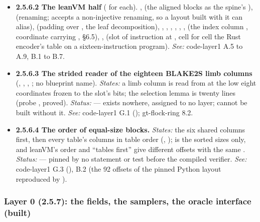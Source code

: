 \begin{itemize}[label={}, leftmargin=1.3em, itemindent=-1.3em, labelwidth=0pt, labelsep=0pt, itemsep=4pt, topsep=3pt]
\item {}\label{obl:node-2.5.6.2}\textbf{2.5.6.2 The leanVM half} ( for each). ,  (the aligned blocks as the spine's ),  (renaming; accepts a non-injective renaming, so a layout built with it can alias),  (padding  over , the leaf decomposition), , , , , , ,  (the index column , coordinate  carrying , §6.5), ,  (slot  of instruction  at , cell for cell the Rust encoder's table on a sixteen-instruction program). \emph{See:} code-layer1 A.5 to A.9, B.1 to B.7.
\item {}\label{obl:node-2.5.6.3}\oblflag\textbf{2.5.6.3 The strided reader of the eighteen BLAKE2S limb columns} (, , , ; no blueprint name). \emph{States:} a limb column is read from  at the low eight coordinates frozen to the slot's bits; the selection lemma is twenty lines (probe , proved). \emph{Status:}   — exists nowhere, assigned to no layer;  cannot be built without it. \emph{See:} code-layer1 G.1 (); gt-flock-ring 8.2.
\item {}\label{obl:node-2.5.6.4}\oblflag\textbf{2.5.6.4 The order of equal-size blocks.} \emph{States:} the six shared columns first, then every table's columns in table order (, );  is the sorted sizes only, and leanVM's order and ``tables first'' give different offsets with the same . \emph{Status:}   — pinned by no statement or test before the compiled verifier. \emph{See:} code-layer1 G.3 (), B.2 (the 92 offsets of the pinned Python layout reproduced by ).
\end{itemize}

\subsubsection[Layer 0 (2.5.7)]{Layer 0 (2.5.7): the fields, the samplers, the oracle interface (built)}\label{sec:obl-gen-layer0}

